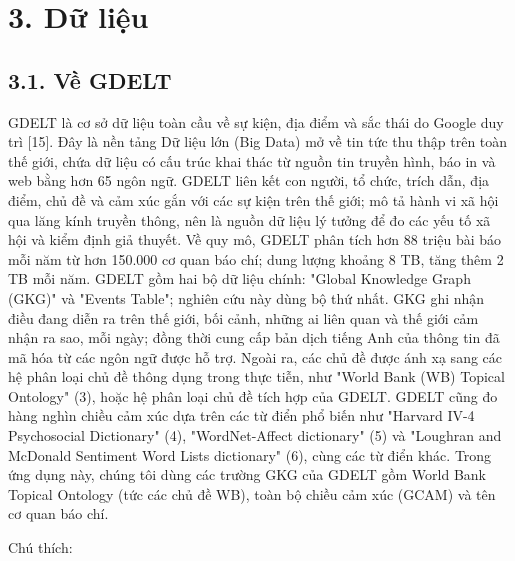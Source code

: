 \section{3. Dữ liệu}

\subsection{3.1. Về GDELT}

GDELT là cơ sở dữ liệu toàn cầu về sự kiện, địa điểm và sắc thái do Google duy trì {[}15{]}. Đây là nền tảng Dữ liệu lớn (Big Data) mở về tin tức thu thập trên toàn thế giới, chứa dữ liệu có cấu trúc khai thác từ nguồn tin truyền hình, báo in và web bằng hơn 65 ngôn ngữ. GDELT liên kết con người, tổ chức, trích dẫn, địa điểm, chủ đề và cảm xúc gắn với các sự kiện trên thế giới; mô tả hành vi xã hội qua lăng kính truyền thông, nên là nguồn dữ liệu lý tưởng để đo các yếu tố xã hội và kiểm định giả thuyết. Về quy mô, GDELT phân tích hơn 88 triệu bài báo mỗi năm từ hơn 150.000 cơ quan báo chí; dung lượng khoảng 8 TB, tăng thêm 2 TB mỗi năm. GDELT gồm hai bộ dữ liệu chính: "Global Knowledge Graph (GKG)" và "Events Table"; nghiên cứu này dùng bộ thứ nhất. GKG ghi nhận điều đang diễn ra trên thế giới, bối cảnh, những ai liên quan và thế giới cảm nhận ra sao, mỗi ngày; đồng thời cung cấp bản dịch tiếng Anh của thông tin đã mã hóa từ các ngôn ngữ được hỗ trợ. Ngoài ra, các chủ đề được ánh xạ sang các hệ phân loại chủ đề thông dụng trong thực tiễn, như "World Bank (WB) Topical Ontology" (3), hoặc hệ phân loại chủ đề tích hợp của GDELT. GDELT cũng đo hàng nghìn chiều cảm xúc dựa trên các từ điển phổ biến như "Harvard IV-4 Psychosocial Dictionary" (4), "WordNet-Affect dictionary" (5) và "Loughran and McDonald Sentiment Word Lists dictionary" (6), cùng các từ điển khác. Trong ứng dụng này, chúng tôi dùng các trường GKG của GDELT gồm World Bank Topical Ontology (tức các chủ đề WB), toàn bộ chiều cảm xúc (GCAM) và tên cơ quan báo chí.

Chú thích:

